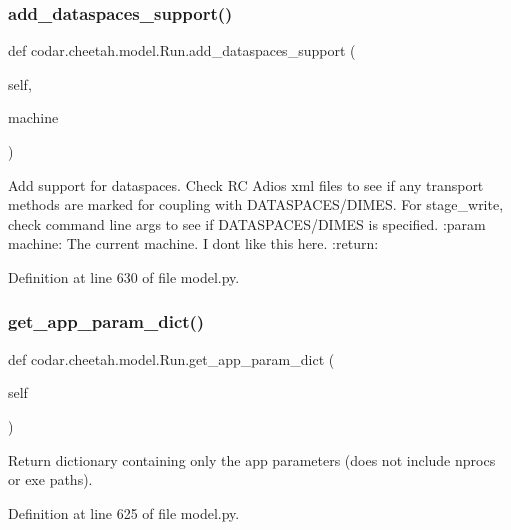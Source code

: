 \subsubsection{\texorpdfstring{add\+\_\+dataspaces\+\_\+support()}{add\_dataspaces\_support()}}
{\footnotesize\ttfamily def codar.\+cheetah.\+model.\+Run.\+add\+\_\+dataspaces\+\_\+support (\begin{DoxyParamCaption}\item[{}]{self,  }\item[{}]{machine }\end{DoxyParamCaption})}

\begin{DoxyVerb}Add support for dataspaces.
Check RC Adios xml files to see if any transport methods are marked
for coupling with DATASPACES/DIMES.
For stage_write, check command line args to see if DATASPACES/DIMES
is specified.
:param machine: The current machine. I dont like this here.
:return:
\end{DoxyVerb}
 

Definition at line 630 of file model.\+py.

\mbox{\label{classcodar_1_1cheetah_1_1model_1_1_run_a30df1617b81f2cfcde9f57d443ca25cb}} 
\subsubsection{\texorpdfstring{get\+\_\+app\+\_\+param\+\_\+dict()}{get\_app\_param\_dict()}}
{\footnotesize\ttfamily def codar.\+cheetah.\+model.\+Run.\+get\+\_\+app\+\_\+param\+\_\+dict (\begin{DoxyParamCaption}\item[{}]{self }\end{DoxyParamCaption})}

\begin{DoxyVerb}Return dictionary containing only the app parameters
(does not include nprocs or exe paths).\end{DoxyVerb}
 

Definition at line 625 of file model.\+py.

\mbox{\label{classcodar_1_1cheetah_1_1model_1_1_run_a8d10cb20808cc4c66a59f949ec40aeb8}} 
